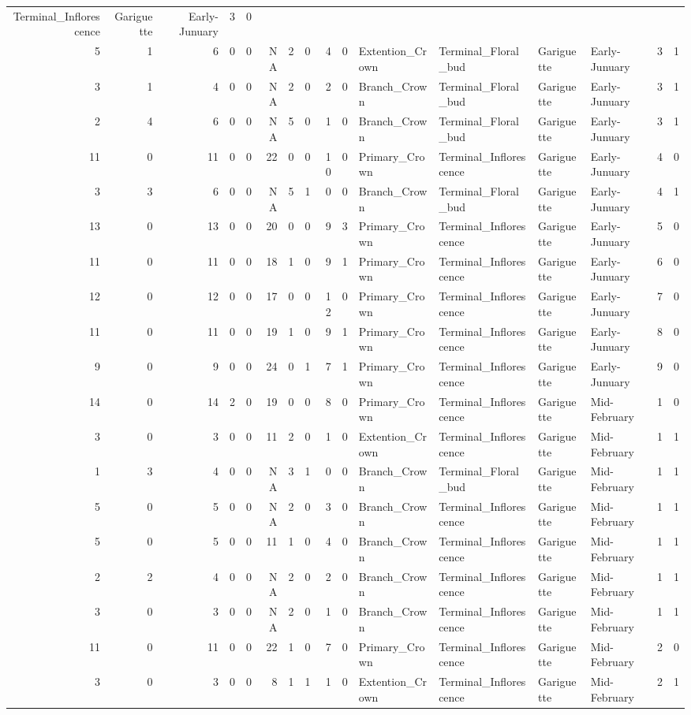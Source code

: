 \documentclass[]{article}
\begin{document}
\begin{longtable}[]{@{}rrrrrrrrrrllllrl@{}}
Terminal\_Inflorescence & Gariguette & Early-Junuary & 3 &
0\tabularnewline
5 & 1 & 6 & 0 & 0 & NA & 2 & 0 & 4 & 0 & Extention\_Crown &
Terminal\_Floral\_bud & Gariguette & Early-Junuary & 3 &
1\tabularnewline
3 & 1 & 4 & 0 & 0 & NA & 2 & 0 & 2 & 0 & Branch\_Crown &
Terminal\_Floral\_bud & Gariguette & Early-Junuary & 3 &
1\tabularnewline
2 & 4 & 6 & 0 & 0 & NA & 5 & 0 & 1 & 0 & Branch\_Crown &
Terminal\_Floral\_bud & Gariguette & Early-Junuary & 3 &
1\tabularnewline
11 & 0 & 11 & 0 & 0 & 22 & 0 & 0 & 10 & 0 & Primary\_Crown &
Terminal\_Inflorescence & Gariguette & Early-Junuary & 4 &
0\tabularnewline
3 & 3 & 6 & 0 & 0 & NA & 5 & 1 & 0 & 0 & Branch\_Crown &
Terminal\_Floral\_bud & Gariguette & Early-Junuary & 4 &
1\tabularnewline
13 & 0 & 13 & 0 & 0 & 20 & 0 & 0 & 9 & 3 & Primary\_Crown &
Terminal\_Inflorescence & Gariguette & Early-Junuary & 5 &
0\tabularnewline
11 & 0 & 11 & 0 & 0 & 18 & 1 & 0 & 9 & 1 & Primary\_Crown &
Terminal\_Inflorescence & Gariguette & Early-Junuary & 6 &
0\tabularnewline
12 & 0 & 12 & 0 & 0 & 17 & 0 & 0 & 12 & 0 & Primary\_Crown &
Terminal\_Inflorescence & Gariguette & Early-Junuary & 7 &
0\tabularnewline
11 & 0 & 11 & 0 & 0 & 19 & 1 & 0 & 9 & 1 & Primary\_Crown &
Terminal\_Inflorescence & Gariguette & Early-Junuary & 8 &
0\tabularnewline
9 & 0 & 9 & 0 & 0 & 24 & 0 & 1 & 7 & 1 & Primary\_Crown &
Terminal\_Inflorescence & Gariguette & Early-Junuary & 9 &
0\tabularnewline
14 & 0 & 14 & 2 & 0 & 19 & 0 & 0 & 8 & 0 & Primary\_Crown &
Terminal\_Inflorescence & Gariguette & Mid-February & 1 &
0\tabularnewline
3 & 0 & 3 & 0 & 0 & 11 & 2 & 0 & 1 & 0 & Extention\_Crown &
Terminal\_Inflorescence & Gariguette & Mid-February & 1 &
1\tabularnewline
1 & 3 & 4 & 0 & 0 & NA & 3 & 1 & 0 & 0 & Branch\_Crown &
Terminal\_Floral\_bud & Gariguette & Mid-February & 1 & 1\tabularnewline
5 & 0 & 5 & 0 & 0 & NA & 2 & 0 & 3 & 0 & Branch\_Crown &
Terminal\_Inflorescence & Gariguette & Mid-February & 1 &
1\tabularnewline
5 & 0 & 5 & 0 & 0 & 11 & 1 & 0 & 4 & 0 & Branch\_Crown &
Terminal\_Inflorescence & Gariguette & Mid-February & 1 &
1\tabularnewline
2 & 2 & 4 & 0 & 0 & NA & 2 & 0 & 2 & 0 & Branch\_Crown &
Terminal\_Inflorescence & Gariguette & Mid-February & 1 &
1\tabularnewline
3 & 0 & 3 & 0 & 0 & NA & 2 & 0 & 1 & 0 & Branch\_Crown &
Terminal\_Inflorescence & Gariguette & Mid-February & 1 &
1\tabularnewline
11 & 0 & 11 & 0 & 0 & 22 & 1 & 0 & 7 & 0 & Primary\_Crown &
Terminal\_Inflorescence & Gariguette & Mid-February & 2 &
0\tabularnewline
3 & 0 & 3 & 0 & 0 & 8 & 1 & 1 & 1 & 0 & Extention\_Crown &
Terminal\_Inflorescence & Gariguette & Mid-February & 2 &
1\tabularnewline

\end{longtable}
\end{document}
